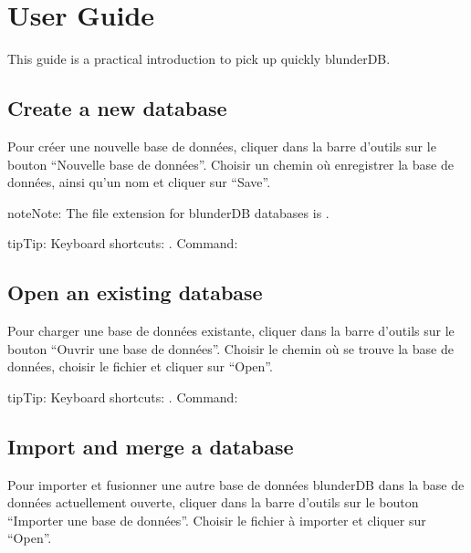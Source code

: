 \documentclass[letterpaper,10pt,english]{sphinxmanual}
\begin{document}
\sphinxstepscope


\section{User Guide}
\label{\detokenize{guide_utilisateur:guide-utilisateur}}\label{\detokenize{guide_utilisateur:id1}}\label{\detokenize{guide_utilisateur::doc}}
\sphinxAtStartPar
This guide is a practical introduction to pick up quickly blunderDB.


\subsection{Create a new database}
\label{\detokenize{guide_utilisateur:creer-une-nouvelle-base-de-donnees}}
\sphinxAtStartPar
Pour créer une nouvelle base de données, cliquer dans la barre d’outils sur le
bouton “Nouvelle base de données”. Choisir un chemin où enregistrer la base de
données, ainsi qu’un nom et cliquer sur “Save”.

\begin{sphinxadmonition}{note}{Note:}
\sphinxAtStartPar
The file extension for blunderDB databases is .
\end{sphinxadmonition}

\begin{sphinxadmonition}{tip}{Tip:}
\sphinxAtStartPar
Keyboard shortcuts: . Command: 
\end{sphinxadmonition}


\subsection{Open an existing database}
\label{\detokenize{guide_utilisateur:ouvrir-une-base-de-donnee-existante}}
\sphinxAtStartPar
Pour charger une base de données existante, cliquer dans la barre d’outils sur
le bouton “Ouvrir une base de données”. Choisir le chemin où se trouve la base
de données, choisir le fichier  et cliquer sur “Open”.

\begin{sphinxadmonition}{tip}{Tip:}
\sphinxAtStartPar
Keyboard shortcuts: . Command: 
\end{sphinxadmonition}


\subsection{Import and merge a database}
\label{\detokenize{guide_utilisateur:importer-et-fusionner-une-base-de-donnees}}
\sphinxAtStartPar
Pour importer et fusionner une autre base de données blunderDB dans la base de
données actuellement ouverte, cliquer dans la barre d’outils sur le bouton
“Importer une base de données”. Choisir le fichier  à importer et
cliquer sur “Open”.
\end{document}
